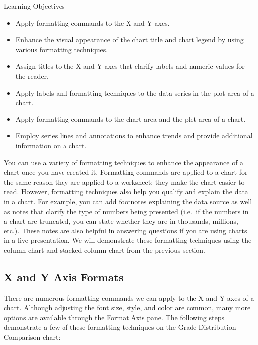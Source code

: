 \begin{center}
	\begin{objbox}{Learning Objectives}
		\begin{itemize}
			\setlength{\itemsep}{0pt}
			\setlength{\parskip}{0pt}
			\setlength{\parsep}{0pt}

			\item Apply formatting commands to the X and Y axes.
			\item Enhance the visual appearance of the chart title and chart legend by using various formatting techniques.
			\item Assign titles to the X and Y axes that clarify labels and numeric values for the reader.
			\item Apply labels and formatting techniques to the data series in the plot area of a chart.
			\item Apply formatting commands to the chart area and the plot area of a chart.
			\item Employ series lines and annotations to enhance trends and provide additional information on a chart.
			
		\end{itemize}
	\end{objbox}
\end{center}


You can use a variety of formatting techniques to enhance the appearance of a chart once you have
created it. Formatting commands are applied to a chart for the same reason they are applied to a
worksheet: they make the chart easier to read. However, formatting techniques also help you qualify
and explain the data in a chart. For example, you can add footnotes explaining the data source as
well as notes that clarify the type of numbers being presented (i.e., if the numbers in a chart are
truncated, you can state whether they are in thousands, millions, etc.). These notes are also helpful
in answering questions if you are using charts in a live presentation. We will demonstrate these
formatting techniques using the column chart and stacked column chart from the previous section.

\subsection{X and Y Axis Formats}

There are numerous formatting commands we can apply to the X and Y axes of a chart. Although
adjusting the font size, style, and color are common, many more options are available through the
Format Axis pane. The following steps demonstrate a few of these formatting techniques on the
Grade Distribution Comparison chart:

